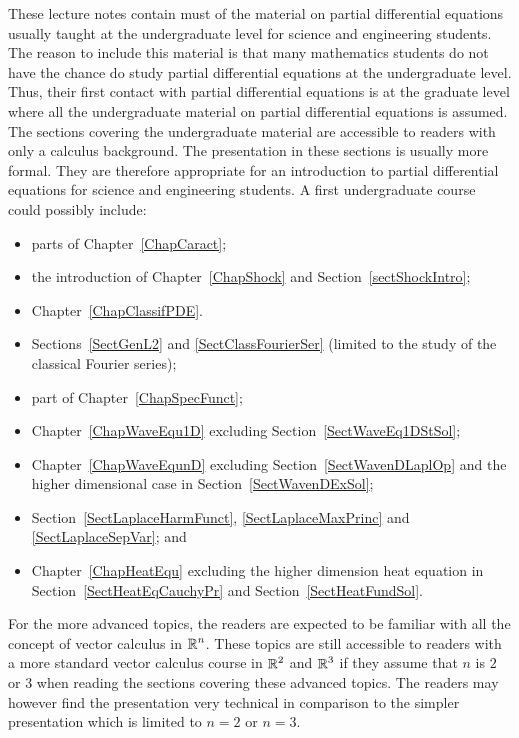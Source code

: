 These lecture notes contain must of the material on partial differential
equations usually taught at the undergraduate level for science and
engineering students.  The reason to include this material is that
many mathematics students do not have the chance do study partial
differential equations at the undergraduate level.  Thus, their first
contact with partial differential equations is at the graduate level
where all the undergraduate material on partial differential equations
is assumed.  The sections
covering the undergraduate material are accessible to readers with
only a calculus background.  The presentation in these sections is
usually more formal.  They are therefore appropriate for an
introduction to partial differential equations for science and
engineering students.  A first undergraduate course could 
possibly include:
{
\begin{itemize} \setlength{\itemsep}{0ex} \setlength{\parskip}{0ex}  
\item parts of Chapter~\ref{ChapCaract};
\item the introduction of Chapter~\ref{ChapShock} and
Section~\ref{sectShockIntro};
\item Chapter~\ref{ChapClassifPDE}.
\item Sections~\ref{SectGenL2} and \ref{SectClassFourierSer} (limited
  to the study of the classical Fourier series);
\item part of Chapter~\ref{ChapSpecFunct};
\item Chapter~\ref{ChapWaveEqu1D} excluding Section~\ref{SectWaveEq1DStSol};
\item Chapter~\ref{ChapWaveEqunD} excluding Section~\ref{SectWavenDLaplOp}
and the higher dimensional case in Section~\ref{SectWavenDExSol};
\item Section~\ref{SectLaplaceHarmFunct}, \ref{SectLaplaceMaxPrinc} and
\ref{SectLaplaceSepVar}; and
\item Chapter~\ref{ChapHeatEqu} excluding the higher dimension heat
equation in Section~\ref{SectHeatEqCauchyPr} and Section~\ref{SectHeatFundSol}.
\end{itemize}
}

For the more advanced topics, the readers are expected to be familiar
with all the concept of vector calculus in $\displaystyle \mathbb{R}^n$.
These topics are still accessible to readers with a more standard
vector calculus course in $\displaystyle \mathbb{R}^2$ and
$\displaystyle \mathbb{R}^3$ if they assume that $n$ is $2$ or
$3$ when reading the sections covering these advanced topics.
The readers may however find the presentation very technical in
comparison to the simpler presentation which is limited to $n=2$ or
$n=3$.


